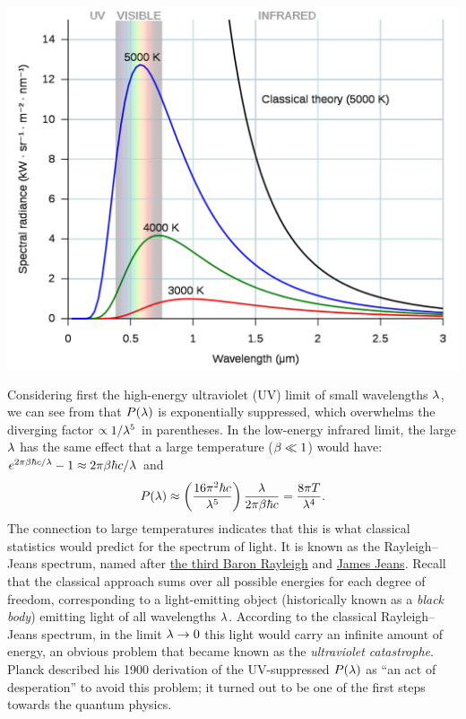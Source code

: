 \begin{center}\includegraphics[width=\textwidth]{figs/unit08_spectrum.pdf}\end{center}

Considering first the high-energy ultraviolet (UV) limit of small wavelengths $\lambda$, we can see from  that $P(\lambda)$ is exponentially suppressed, which overwhelms the diverging factor $\propto 1 / \lambda^5$ in parentheses.
In the low-energy infrared limit, the large $\lambda$ has the same effect that a large temperature ($\beta \ll 1$) would have: $e^{2\pi\beta \hbar c / \lambda} - 1 \approx 2\pi\beta \hbar c / \lambda$ and
\begin{equation*}
  P(\lambda) \approx \left(\frac{16\pi^2 \hbar c}{\lambda^5}\right) \frac{\lambda}{2\pi\beta \hbar c} = \frac{8\pi T}{\lambda^4}.
\end{equation*}
The connection to large temperatures indicates that this is what classical statistics would predict for the spectrum of light.
It is known as the Rayleigh--Jeans spectrum, named after \href{https://en.wikipedia.org/wiki/John_William_Strutt,_3rd_Baron_Rayleigh}{the third Baron Rayleigh} and \href{https://en.wikipedia.org/wiki/James_Jeans}{James Jeans}.
Recall that the classical approach sums over all possible energies for each degree of freedom, corresponding to a light-emitting object (historically known as a \textit{black body}) emitting light of all wavelengths $\lambda$.
According to the classical Rayleigh--Jeans spectrum, in the limit $\lambda \to 0$ this light would carry an infinite amount of energy, an obvious problem that became known as the \textit{ultraviolet catastrophe}.
Planck described his 1900 derivation of the UV-suppressed $P(\lambda)$ as ``an act of desperation'' to avoid this problem; it turned out to be one of the first steps towards the quantum physics.

